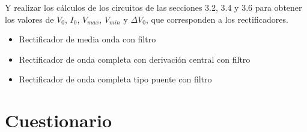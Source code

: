 \documentclass[12pt]{article}
\begin{document}
        Y realizar los cálculos de los circuitos de las secciones 3.2, 3.4 y 3.6 para obtener los valores de $V_0$,
        $I_0$, $V_{max}$, $V_{min}$ y $\Delta V_0$, que corresponden a los rectificadores.
        \begin{itemize}
            \item Rectificador de media onda con filtro
            \item Rectificador de onda completa con derivación central con filtro
            \item Rectificador de onda completa tipo puente con filtro
        \end{itemize}

        \section*{Cuestionario}
        \label{sec:cuestionario}
\end{document}
